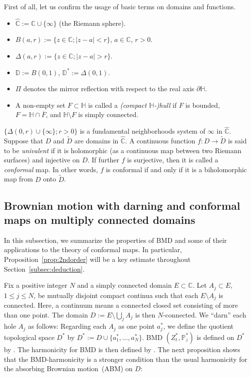 \documentclass[preprint,12pt]{elsarticle}
\theoremstyle{definition}
\newcommand{\C}{\mathbb{C}}
\newcommand{\disk}{\mathbb{D}}
\newcommand{\uhp}{\mathbb{H}}
\begin{document}
First of all, let us confirm the usage of basic terms on domains and functions.
\begin{itemize}
\item $\hat{\C} := \C \cup \{\infty\}$ (the Riemann sphere).
\item $B(a, r) := \{ z \in \C; \lvert z-a \rvert < r \}$, $a \in \C$, $r>0$.
\item $\Delta(a, r) := \{ z \in \C; \lvert z-a \rvert > r \}$.
\item $\disk:=B(0, 1)$, $\disk^*:=\Delta(0,1)$.
\item $\Pi$ denotes the mirror reflection
with respect to the real axis $\partial \uhp$.
\item A non-empty set $F \subset \uhp$ is called
a \emph{(compact $\uhp$-)hull} if $F$ is bounded, $F=\uhp \cap \overline{F}$,
and $\uhp \setminus F$ is simply connected.
\end{itemize}
$\{\Delta(0, r) \cup \{\infty\}; r>0\}$ is a fundamental neighborhoods system
of $\infty$ in $\hat{\C}$.
Suppose that $D$ and $\tilde{D}$ are domains in $\hat{\C}$.
A continuous function $f \colon D \to \tilde{D}$ is said to be \emph{univalent}
if it is holomorphic (as a continuous map between two Riemann surfaces)
and injective on $D$.
If further $f$ is surjective, then it is called a \emph{conformal} map.
In other words,
$f$ is conformal if and only if it is a biholomorphic map from $D$ onto $\tilde{D}$.

\subsection{Brownian motion with darning and conformal maps on multiply connected domains}
\label{subsec:BMD_conf}

In this subsection, we summarize the properties of BMD
and some of their applications to the theory of conformal maps.
In particular, Proposition~\ref{prop:2ndorder} will be a key estimate
throughout Section~\ref{subsec:deduction}.

Fix a positive integer $N$ and a simply connected domain $E \subset \C$.
Let $A_j \subset E$, $1 \leq j \leq N$, be mutually disjoint compact continua
such that each $E \setminus A_j$ is connected.
Here, a continuum means a connected closed set consisting of more than one point.
The domain $D := E \setminus \bigcup_j A_j$ is then $N$-connected.
We ``darn'' each hole $A_j$ as follows:
Regarding each $A_j$ as one point $a^*_j$,
we define the quotient topological space $D^*$ by
$D^*:=D \cup \{a^*_1, \ldots, a^*_N\}$.
BMD $(Z^*_t, \mathbb{P}^*_z)$ is defined on $D^*$ by \cite[Definition~2.1]{CFR16}.
The harmonicity for BMD is then defined by \cite[(3.2)]{CFR16}.
The next proposition shows that the BMD-harmonicity
is a stronger condition than the usual harmonicity
for the absorbing Brownian motion~(ABM) on $D$:
\end{document}
